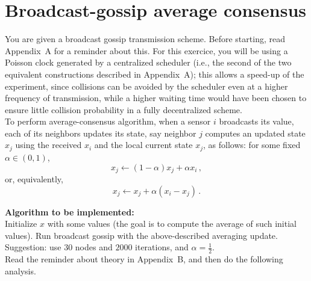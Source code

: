 \documentclass{article}
\begin{document}
\newpage
\section{Broadcast-gossip average consensus}
You are given a broadcast gossip transmission scheme. Before starting, read Appendix~A for a reminder about this.
For this exercice, you will be using a Poisson clock generated by a centralized scheduler (i.e., the second of the two equivalent constructions described in Appendix~A); this allows a speed-up of the experiment, since collisions can be avoided by the scheduler even at a higher frequency of transmission, while a higher waiting time would have been chosen to ensure little collision probability in a fully decentralized scheme.\\

To perform average-consensus algorithm, when a sensor $i$ broadcasts its value, each of its neighbors updates its state, say neighbor $j$ computes an updated state $x_j$ using the received $x_i$ and the local current state $x_j$, as follows:
 for some fixed $\alpha \in (0,1)$,
\[ x_j  \leftarrow (1- \alpha) x_j + \alpha x_i \,,\]
 or, equivalently,
\[ x_j \leftarrow x_j + \alpha (x_i-x_j) \,.\]

\textbf{Algorithm to be implemented:}\\
Initialize $x$ with some values (the goal is to compute the average of such initial values).
Run broadcast gossip with the above-described averaging update.\\
Suggestion: use $30$ nodes and $2000$ iterations, and $\alpha = \frac{1}{2}$.\\

Read the reminder about theory in Appendix~B, and then do the following analysis.\\
\end{document}
